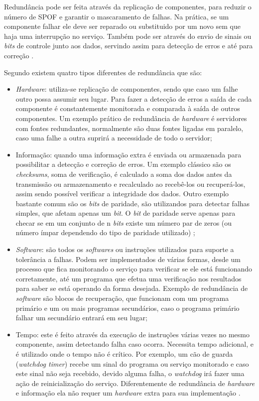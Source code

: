 Redundância pode ser feita através da replicação de componentes, para reduzir o número de SPOF e garantir o mascaramento de falhas.
Na prática, se um componente falhar ele deve ser reparado ou substituido por um novo sem que haja uma interrupção no serviço.
Também pode ser através do envio de sinais ou \textit{bits} de controle junto aos dados, 
servindo assim para detecção de erros e até para correção \cite{weber2002}.

Segundo \cite{norvag2000} existem quatro tipos diferentes de redundância que são:
\begin{itemize}
 \item \textit{Hardware}: utiliza-se replicação de componentes, sendo que caso um falhe outro possa assumir seu lugar. 
 Para fazer a detecção de erros a saída de cada componente é constantemente monitorada e comparada à saída de outros componentes.
 Um exemplo prático de redundância de \textit{hardware} é servidores com fontes redundantes, normalmente são duas fontes ligadas em paralelo, 
 caso uma falhe a outra suprirá a necessidade de todo o servidor;
 \item Informação: quando uma informação extra é enviada ou armazenada para possibilitar a detecção e correção de erros.
 Um exemplo clássico são os \textit{checksums}, soma de verificação, é calculado a soma dos dados antes da transmissão ou armazenamento 
 e recalculado ao recebê-los ou recuperá-los, assim sendo possível verificar a integridade dos dados. Outro exemplo bastante comum são os 
 \textit{bits} de paridade, são utilizandos para detectar falhas simples, que afetam apenas um \textit{bit}. O \textit{bit} de paridade 
 serve apenas para checar se em um conjunto de n \textit{bits} existe um número par de zeros (ou número ímpar dependendo do tipo de paridade 
 utilizado) \cite{weber2002};
 \item \textit{Software}: são todos os \textit{softwares} ou instruções utilizados para suporte a tolerância a falhas. Podem ser implementados
 de várias formas, desde um processo que fica monitorando o serviço para verificar se ele está funcionando corretamente, até um programa
 que efetua uma verificação nos resultados para saber se está operando da forma desejada. Exemplo de redundância de \textit{software} são 
 blocos de recuperação, que funcionam com um programa primário e um ou mais programas secundários, caso o programa primário falhar um secundário
 entrará em seu lugar;
 \item Tempo: este é feito através da execução de instruções várias vezes no mesmo componente, assim detectando falha caso ocorra.
 Necessita tempo adicional, e é utilizado onde o tempo não é crítico. Por exemplo, um cão de guarda (\textit{watchdog timer})
 recebe um sinal do programa ou serviço monitorado e caso este sinal não seja recebido, devido alguma falha, o \textit{watchdog} irá fazer 
 uma ação de reinicialização do serviço.
 Diferentemente de redundância de \textit{hardware} e informação ela não requer um \textit{hardware} extra para sua implementação \cite{costa2009}.
\end{itemize}

